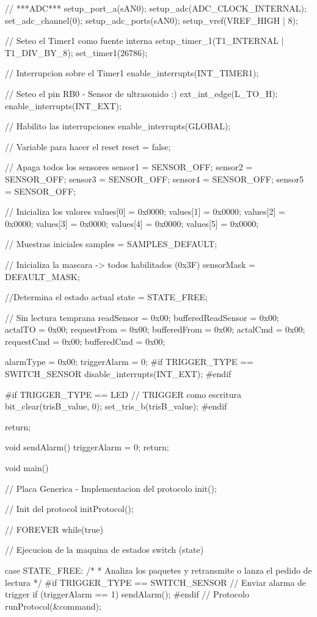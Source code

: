 {\begin{verbatimtab}
{	// ***ADC***
	setup_port_a(sAN0);
	setup_adc(ADC_CLOCK_INTERNAL);
	set_adc_channel(0);
	setup_adc_ports(sAN0);
	setup_vref(VREF_HIGH | 8);
	
	// Seteo el Timer1 como fuente interna
	setup_timer_1(T1_INTERNAL | T1_DIV_BY_8);
	set_timer1(26786);
	
	// Interrupcion sobre el Timer1
	enable_interrupts(INT_TIMER1);

	// Seteo el pin RB0 - Sensor de ultrasonido :)
	ext_int_edge(L_TO_H);
	enable_interrupts(INT_EXT);

	// Habilito las interrupciones
	enable_interrupts(GLOBAL);
	
	// Variable para hacer el reset
	reset = false;

	// Apaga todos los sensores
	sensor1 = SENSOR_OFF;
	sensor2 = SENSOR_OFF;
	sensor3 = SENSOR_OFF;
	sensor4 = SENSOR_OFF;
	sensor5 = SENSOR_OFF;

	// Inicializa los valores
	values[0] = 0x0000;
	values[1] = 0x0000;
	values[2] = 0x0000;
	values[3] = 0x0000;
	values[4] = 0x0000;
	values[5] = 0x0000;

	// Muestras iniciales
	samples = SAMPLES_DEFAULT;
	
	// Inicializa la mascara -> todos habilitados (0x3F)
	sensorMask = DEFAULT_MASK;
	
	//Determina el estado actual
	state = STATE_FREE;
	
	// Sin lectura temprana
	readSensor = 0x00;
	bufferedReadSensor = 0x00;
	actalTO = 0x00;
	requestFrom = 0x00;
	bufferedFrom = 0x00;
	actalCmd = 0x00;
	requestCmd = 0x00;
	bufferedCmd = 0x00;

	alarmType = 0x00;
	triggerAlarm = 0;
#if TRIGGER_TYPE == SWITCH_SENSOR
	disable_interrupts(INT_EXT);
#endif

#if TRIGGER_TYPE == LED
	// TRIGGER como escritura
	bit_clear(trisB_value, 0);
	set_tris_b(trisB_value);
#endif

	return;	
}	

void sendAlarm()
{
	triggerAlarm = 0;
	return;
}	

void main()
{
	// Placa Generica - Implementacion del protocolo
	init();

	// Init del protocol
	initProtocol();

	// FOREVER
	while(true)
	{
		// Ejecucion de la maquina de estados
		switch (state)
		{
			case STATE_FREE:
				/*
				* Analiza los paquetes y retransmite o lanza el pedido de lectura
				*/
#if TRIGGER_TYPE == SWITCH_SENSOR
				// Enviar alarma de trigger
				if (triggerAlarm == 1)
					sendAlarm();
#endif
				// Protocolo
				runProtocol(&command);

}}}
\end{verbatimtab}}
